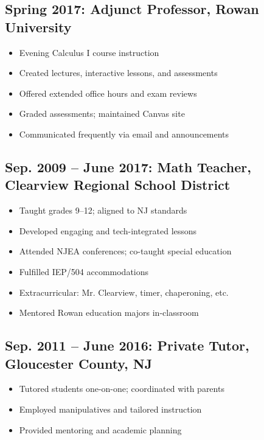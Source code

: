 \documentclass[10pt]{article}
\begin{document}
\subsection*{Spring 2017: Adjunct Professor, Rowan University}
\begin{itemize}
    \item Evening Calculus I course instruction
    \item Created lectures, interactive lessons, and assessments
    \item Offered extended office hours and exam reviews
    \item Graded assessments; maintained Canvas site
    \item Communicated frequently via email and announcements
\end{itemize}

\subsection*{Sep. 2009 -- June 2017: Math Teacher, Clearview Regional School District}
\begin{itemize}
    \item Taught grades 9--12; aligned to NJ standards
    \item Developed engaging and tech-integrated lessons
    \item Attended NJEA conferences; co-taught special education
    \item Fulfilled IEP/504 accommodations
    \item Extracurricular: Mr. Clearview, timer, chaperoning, etc.
    \item Mentored Rowan education majors in-classroom
\end{itemize}

\subsection*{Sep. 2011 -- June 2016: Private Tutor, Gloucester County, NJ}
\begin{itemize}
    \item Tutored students one-on-one; coordinated with parents
    \item Employed manipulatives and tailored instruction
    \item Provided mentoring and academic planning
\end{itemize}

\end{document}
